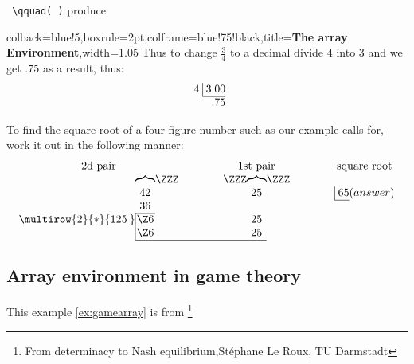 \verb*+ \qquad( )+ produce

\begin{tcblisting}{colback=blue!5,boxrule=2pt,colframe=blue!75!black,title=\textbf{The array Environment},width=1.05\textwidth}
Thus to change $\frac34$ to a decimal divide $4$ into $3$
and we get $.75$ as a result, thus:
\[
\begin{array}{r@{}r@{}}
4 \; & \vline \; 3.00 \\\cline{2-2}
     &            .75
\end{array}
\]

To find the square root of a four-figure number
such as our example calls for, work it out in the
following manner:
\[
\arraycolsep=0em
\begin{array}{cccccccccccc}
\multicolumn{3}{c}{\text{2d pair}} &\qquad&\qquad&
\multicolumn{3}{c}{\text{1st pair}}&\qquad&\qquad&
\multicolumn{2}{c}{\text{square root}}\\
 & \overbrace{\quad}&\ZZZ&&&\ZZZ&\overbrace{\quad}&\ZZZ\\
 & 42 &&&&& 25 &&&&\vline\;65&(answer)\\\cline{11-11}
 & 36 &&&&& \\\cline{2-2}
\multirow{2}{*}{125\:} & \vline\hfill \Z6 \hfill&&&&& 25\\
 & \vline\hfill \Z6 \hfill&&&&& 25\\\cline{2-7}
\end{array}
\]

\end{tcblisting}

\subsection{Array environment in game theory}
This example \ref{ex:gamearray} is from \footnote{From determinacy to Nash equilibrium,St\'ephane Le Roux, TU Darmstadt }

